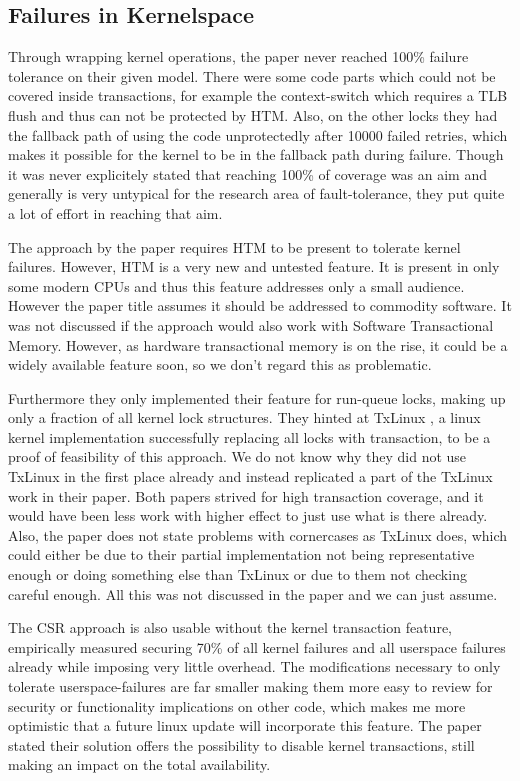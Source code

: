 \documentclass[a4paper,10pt,twoside]{article}
\begin{document}
\subsection{Failures in Kernelspace}
Through wrapping kernel operations, the paper never reached 100\% failure tolerance on their given model. There were some code parts which could not be covered inside transactions, for example the context-switch which requires a TLB flush and thus can not be protected by HTM. Also, on the other locks they had the fallback path of using the code unprotectedly after 10000 failed retries, which makes it possible for the kernel to be in the fallback path during failure. Though it was never explicitely stated that reaching 100\% of coverage was an aim and generally is very untypical for the research area of fault-tolerance, they put quite a lot of effort in reaching that aim.

The approach by the paper requires HTM to be present to tolerate kernel failures. However, HTM is a very new and untested %
feature. It is present in only some modern CPUs and thus this feature addresses only a small audience. However the paper title assumes it should be addressed to commodity software. It was not discussed if the approach would also work with Software Transactional Memory. However, as hardware transactional memory is on the rise, it could be a widely available feature soon, so we don't regard this as problematic.

Furthermore they only implemented their feature for run-queue locks, making up only a fraction of all kernel lock structures. They hinted at TxLinux \cite{TxLinux}, a linux kernel implementation successfully replacing all locks with transaction, to be a proof of feasibility of this approach. We do not know why they did not use TxLinux in the first place already and instead replicated a part of the TxLinux work in their paper. Both papers strived for high transaction coverage, and it would have been less work with higher effect to just use what is there already. Also, the paper does not state problems with cornercases as TxLinux does, which could either be due to their partial implementation not being representative enough or doing something else than TxLinux or due to them not checking careful enough. All this was not discussed in the paper and we can just assume.

The CSR approach is also usable without the kernel transaction feature, empirically measured securing 70\% of all kernel failures and all userspace failures already while imposing very little overhead. The modifications necessary to only tolerate userspace-failures are far smaller making them more easy to review for security or functionality implications on other code, which makes me more optimistic that a future linux update will incorporate this feature. The paper stated their solution offers the possibility to disable kernel transactions, still making an impact on the total availability.
\end{document}

